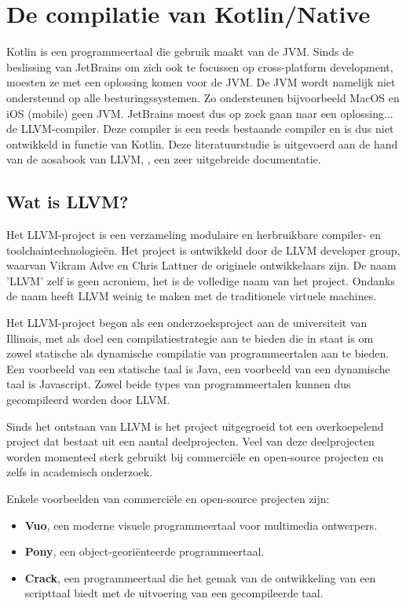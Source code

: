 
\chapter{De compilatie van Kotlin/Native}
\label{ch:compiler}
Kotlin is een programmeertaal die gebruik maakt van de JVM. Sinds de beslissing van JetBrains om zich ook te focussen op cross-platform development, moesten ze met een oplossing komen voor de JVM. De JVM wordt namelijk niet ondersteund op alle besturingssystemen. Zo ondersteunen bijvoorbeeld MacOS en iOS (mobile) geen JVM. JetBrains moest dus op zoek gaan naar een oplossing... de LLVM-compiler. Deze compiler is een reeds bestaande compiler en is dus niet ontwikkeld in functie van Kotlin. Deze literatuurstudie is uitgevoerd aan de hand van de aosabook van LLVM, \textcite{aosa}, een zeer uitgebreide documentatie. 

\section{Wat is LLVM?}
Het LLVM-project is een verzameling modulaire en herbruikbare compiler- en toolchaintechnologieën. Het project is ontwikkeld door de LLVM developer group, waarvan Vikram Adve en Chris Lattner de originele ontwikkelaars zijn. De naam 'LLVM' zelf is geen acroniem, het is de volledige naam van het project. Ondanks de naam heeft LLVM weinig te maken met de traditionele virtuele machines.

Het LLVM-project begon als een onderzoeksproject aan de universiteit van Illinois, met als doel een compilatiestrategie aan te bieden die in staat is om zowel statische als dynamische compilatie van programmeertalen aan te bieden. Een voorbeeld van een statische taal is Java, een voorbeeld van een dynamische taal is Javascript. Zowel beide types van programmeertalen kunnen dus gecompileerd worden door LLVM.

Sinds het ontstaan van LLVM is het project uitgegroeid tot een overkoepelend project dat bestaat uit een aantal deelprojecten. Veel van deze deelprojecten worden momenteel sterk gebruikt bij commerciële en open-source projecten en zelfs in academisch onderzoek.

Enkele voorbeelden van commerciële en open-source projecten zijn:
\begin{itemize}
	\item \textbf{Vuo}, een moderne visuele programmeertaal voor multimedia ontwerpers.
	\item \textbf{Pony}, een object-georiënteerde programmeertaal.
	\item \textbf{Crack}, een programmeertaal die het gemak van de ontwikkeling van een scripttaal biedt met de uitvoering van een gecompileerde taal.
\end{itemize}

